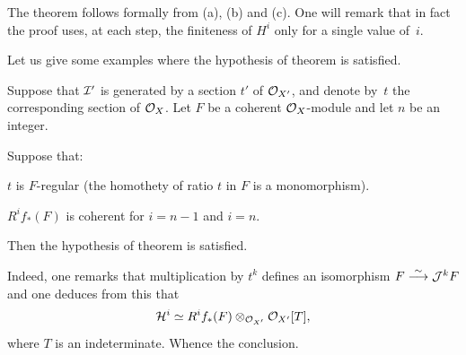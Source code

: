 The theorem follows formally from (a), (b) and (c). One will remark that in fact the proof uses, at each step, the finiteness of $H^i$ only for a single value of~$i$.

Let us give some examples where the hypothesis of theorem  is satisfied.

\begin{corollary}\setcounter {equation}{28} \label{IX.1.2}
Suppose that ${\mathcal I}'$ is generated by a section $t'$ of ${\mathcal O}_{X'}$, and denote by~$t$ the corresponding section of $\mathcal{O}_X$. Let $F$ be a coherent $\mathcal{O}_X$-module and let $n$ be an integer.

Suppose that:
\begin{enumeratei}
\item
$t$ is $F$-regular (\ie the homothety of ratio $t$ in $F$ is a monomorphism).
\item
$R^if_*(F)$ is coherent for $i=n-1$ and $i=n$.
\end{enumeratei}
Then the hypothesis of theorem  is satisfied.
\end{corollary}

Indeed, one remarks that multiplication by $t^k$ defines an isomorphism $ F\overset{\sim}{\longrightarrow}\mathcal{J}^kF$ and one deduces from this that
\begin{equation} \label{eq:IX.1.29}
{\mathcal H}^i \simeq R^if_*(F)\otimes_{{\mathcal O}_{X'}}{\mathcal O}_{X'}[T],
\end{equation}
where $T$ is an indeterminate. Whence the conclusion.

